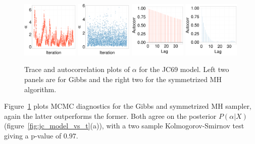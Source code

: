  \begin{figure}[H]
  \centering

  \begin{minipage}[!hp]{0.99\linewidth}
  	\centering
    \includegraphics [width=0.24\textwidth, angle=0]{figs/JC_ks/jc_traceGBS_44_05_3_.pdf}
    \includegraphics [width=0.24\textwidth, angle=0]{figs/JC_ks/jc_traceMH_44_05_3_.pdf}
    \includegraphics [width=0.24\textwidth, angle=0]{figs/JC_ks/jc_gbsacf_44_05_3_.pdf}
    \includegraphics [width=0.24\textwidth, angle=0]{figs/JC_ks/jc_mhacf_44_05_3_.pdf}
  \end{minipage}
    \caption{Trace and autocorrelation plots of $\alpha$ for the JC69 model. Left two panels are for Gibbs and the right two for the symmetrized MH algorithm.}
    \label{fig:ACC_JC_m}
  \end{figure}
  Figure~\ref{fig:ACC_JC_m} plots MCMC diagnostics for the Gibbs and symmetrized MH sampler, again the latter outperforms the former. 
  Both agree on the posterior $P(\alpha|X)$ (figure~\ref{fig:jc_model_vs_t}(a)), with a two sample Kolmogorov-Smirnov test giving a p-value of $0.97$. 
